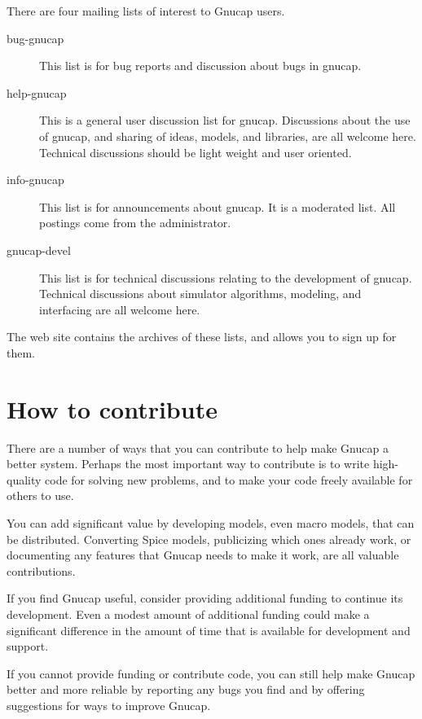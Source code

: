 There are four mailing lists of interest to Gnucap users.
\begin{description}

\item[bug-gnucap]
This list is for bug reports and discussion about bugs in gnucap.

\item[help-gnucap]
This is a general user discussion list for gnucap. Discussions about
the use of gnucap, and sharing of ideas, models, and libraries, are
all welcome here.  Technical discussions should be light weight and
user oriented.

\item[info-gnucap]
This list is for announcements about gnucap. It is a moderated
list. All postings come from the administrator.

\item[gnucap-devel]
This list is for technical discussions relating to the development of
gnucap.  Technical discussions about simulator algorithms, modeling,
and interfacing are all welcome here.

\end{description}

The web site contains the archives of these lists, and allows you to
sign up for them.
\section{How to contribute}

There are a number of ways that you can contribute to help make Gnucap
a better system. Perhaps the most important way to contribute is to
write high-quality code for solving new problems, and to make your
code freely available for others to use.

You can add significant value by developing models, even macro models,
that can be distributed. Converting Spice models, publicizing which
ones already work, or documenting any features that Gnucap needs to
make it work, are all valuable contributions.

If you find Gnucap useful, consider providing additional funding to
continue its development. Even a modest amount of additional funding
could make a significant difference in the amount of time that is
available for development and support.

If you cannot provide funding or contribute code, you can still help
make Gnucap better and more reliable by reporting any bugs you find
and by offering suggestions for ways to improve Gnucap.

